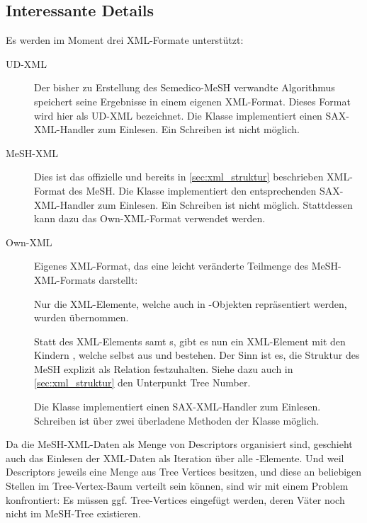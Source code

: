 \subsection{Interessante Details}
\label{sec:sw_details}
Es werden im Moment drei XML-Formate unterstützt:

\begin{description}
\item[UD-XML] Der bisher zu Erstellung des Semedico-MeSH verwandte Algorithmus speichert seine Ergebnisse in einem eigenen XML-Format. Dieses Format wird hier als UD-XML bezeichnet. Die Klasse  implementiert einen SAX-XML-Handler zum Einlesen. Ein Schreiben ist nicht möglich.

\item[MeSH-XML] Dies ist das offizielle und bereits in \ref{sec:xml_struktur}  beschrieben XML-Format des MeSH. Die Klasse  implementiert den entsprechenden SAX-XML-Handler zum Einlesen. Ein Schreiben ist nicht möglich. Stattdessen kann dazu das Own-XML-Format verwendet werden. 

\item[Own-XML] Eigenes XML-Format, das eine leicht veränderte Teilmenge des MeSH-XML-Formats darstellt: \par

Nur die XML-Elemente, welche auch in -Objekten repräsentiert werden, wurden übernommen. \par

Statt des XML-Elements  samt s, gibt es nun ein XML-Element  mit den Kindern , welche selbst aus  und  bestehen. Der Sinn ist es, die Struktur des MeSH explizit als Relation festzuhalten. Siehe dazu auch in \ref{sec:xml_struktur} den Unterpunkt Tree Number. \par
 
Die Klasse  implementiert einen SAX-XML-Handler zum Einlesen. Schreiben ist über zwei überladene Methoden  der Klasse  möglich.
\end{description}

Da die MeSH-XML-Daten als Menge von Descriptors organisiert sind, geschieht auch das Einlesen der XML-Daten als Iteration über alle -Elemente. Und weil Descriptors jeweils eine Menge aus Tree Vertices besitzen, und diese an beliebigen Stellen im Tree-Vertex-Baum verteilt sein können, sind wir mit einem Problem konfrontiert: Es müssen ggf. Tree-Vertices eingefügt werden, deren Väter noch nicht im MeSH-Tree existieren. \par 

